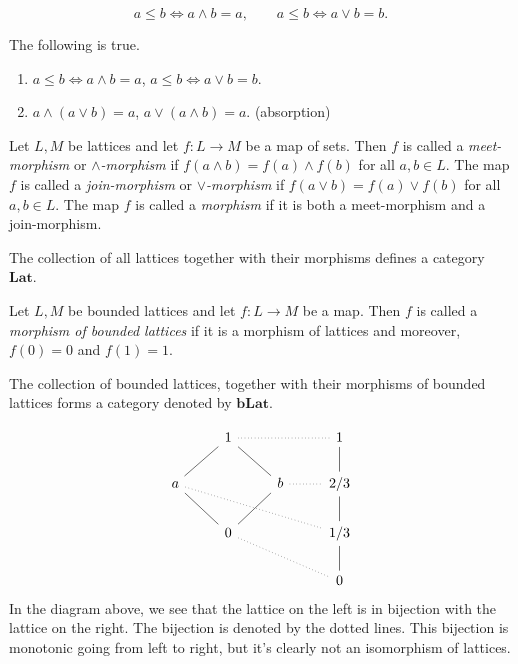 \[ a \leq b \iff a \wedge b = a, \qquad a \leq b \iff a \vee b = b. \]
\begin{lemma}
The following is true.
\begin{enumerate}
	\item $a \leq b \iff a \wedge b = a$, $a \leq b \iff a \vee b = b$.
	\item $a \wedge (a \vee b) = a$, $a \vee (a \wedge b) = a$. (absorption)
\end{enumerate}
\end{lemma}

\begin{definition}
Let $L,M$ be lattices and let $f : L \to M$ be a map of sets. Then $f$ is called a \emph{meet-morphism} or \emph{$\wedge$-morphism} if $f(a \wedge b) = f(a) \wedge f(b)$ for all $a,b \in L$. The map $f$ is called a \emph{join-morphism} or \emph{$\vee$-morphism} if $f(a \vee b) = f(a) \vee f(b)$ for all $a,b \in L$. The map $f$ is called a \emph{morphism} if it is both a meet-morphism and a join-morphism.
\end{definition}
The collection of all lattices together with their morphisms defines a category $\mathbf{Lat}$.
\begin{definition}
Let $L,M$ be bounded lattices and let $f : L \to M$ be a map. Then $f$ is called a \emph{morphism of bounded lattices} if it is a morphism of lattices and moreover, $f(0) = 0$ and $f(1) = 1$.
\end{definition}
The collection of bounded lattices, together with their morphisms of bounded lattices forms a category denoted by $\mathbf{bLat}$.
\begin{example}
\label{example:monotonic but not an isomorphism}
\[ \begin{tikzcd}
  & 1 \arrow[dl, no head] \arrow[rr, no head, dotted] \arrow[dr, no head] &   & 1 \arrow[d, no head] \\
a \arrow[dr, no head] \arrow[drrr, no head, dotted] &   & b \arrow[dl, no head] \arrow[r, no head, dotted] & 2/3 \arrow[d, no head] \\
  & 0 \arrow[drr, no head, dotted] &   & 1/3 \arrow[d, no head] \\
  &   &   & 0 
\end{tikzcd} \]
In the diagram above, we see that the lattice on the left is in bijection with the lattice on the right. The bijection is denoted by the dotted lines. This bijection is monotonic going from left to right, but it's clearly not an isomorphism of lattices.
\end{example}
